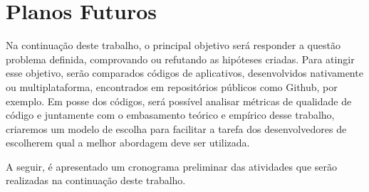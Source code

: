 \section{Planos Futuros} \label{section:planosfuturos}

Na continuação deste trabalho, o principal objetivo será responder a questão problema definida, comprovando ou refutando as hipóteses criadas.
Para atingir esse objetivo, serão comparados códigos de aplicativos, desenvolvidos nativamente ou multiplataforma, 
encontrados em repositórios públicos como Github, por exemplo. 
Em posse dos códigos, será possível analisar métricas de qualidade de código e juntamente com o embasamento teórico e empírico desse trabalho, 
criaremos um modelo de escolha para facilitar a tarefa dos desenvolvedores de escolherem qual a melhor abordagem deve ser utilizada.

A seguir, é apresentado um cronograma preliminar das atividades que serão realizadas na continuação deste trabalho.

\begin{table}[h]
\caption{Cronograma inicial para o TCC 2}
\label{tab:cronograma}
\end{table}

